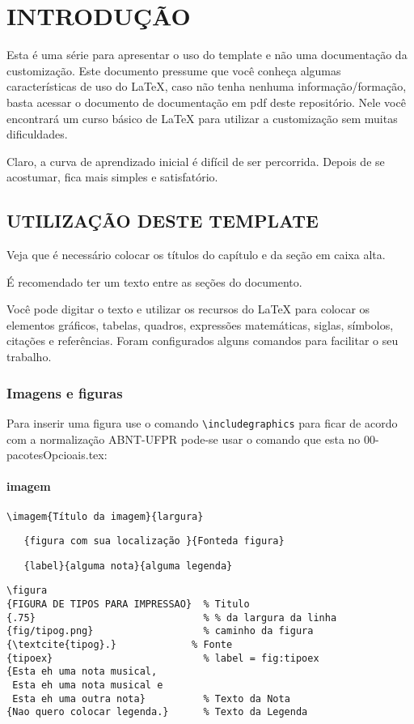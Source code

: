 \chapter{INTRODUÇÃO} \label{cha:introd}

Esta é uma série para apresentar o uso do template e não uma documentação da customização. Este documento pressume que você conheça algumas características de uso do LaTeX, caso não tenha nenhuma informação/formação, basta acessar o documento de documentação em pdf deste repositório. Nele você encontrará um curso básico de LaTeX para utilizar a customização sem muitas dificuldades.

Claro, a curva de aprendizado inicial é difícil de ser percorrida. Depois de se acostumar, fica mais simples e satisfatório.

\section{UTILIZAÇÃO DESTE TEMPLATE} \label{sec:util}

Veja que é necessário colocar os títulos do capítulo e da seção em caixa alta. 

É recomendado ter um texto entre as seções do documento.

Você pode digitar o texto e utilizar os recursos do LaTeX para colocar os elementos gráficos, tabelas, quadros, expressões matemáticas, siglas, símbolos, citações e referências. Foram configurados alguns comandos para facilitar o seu trabalho.


\subsection[Imagens]{Imagens e figuras}\label{ssec:imafig}

Para inserir uma figura use o comando \verb+\includegraphics+ 
para ficar de acordo com a normalização ABNT-UFPR pode-se usar o comando que esta no 00-pacotesOpcioais.tex:


\subsubsection{imagem}\label{sssec:imagem}

\verb+\imagem{Título da imagem}{largura}+ 

\verb+   {figura com sua localização }{Fonteda figura}+

\verb+   {label}{alguma nota}{alguma legenda}+

\begin{lstlisting}
\figura
{FIGURA DE TIPOS PARA IMPRESSAO}  % Titulo
{.75}                             % % da largura da linha
{fig/tipog.png}                   % caminho da figura
{\textcite{tipog}.}             % Fonte
{tipoex}                          % label = fig:tipoex
{Esta eh uma nota musical, 
 Esta eh uma nota musical e 
 Esta eh uma outra nota}          % Texto da Nota
{Nao quero colocar legenda.}      % Texto da Legenda
\end{lstlisting}

